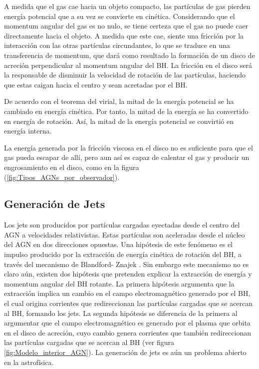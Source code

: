 A medida que el gas cae hacia un objeto compacto, las partículas de gas pierden energía potencial que a su vez se convierte en cinética. Considerando que el momentum angular del gas es no nulo, se tiene certeza que el gas no puede caer directamente hacia el objeto. A medida que este cae, siente una fricción por la interacción con las otras partículas circundantes, lo que se traduce en una transferencia de momentum, que dará como resultado la formación de un disco de acreción perpendicular al momentum angular del BH. La fricción en el disco será la responsable de disminuir la velocidad de rotación de las partículas, haciendo que estas caigan hacia el centro y sean acretadas por el BH.  

De acuerdo con el teorema del virial, la mitad de la energía potencial se ha cambiado en energía cinética. Por tanto, la mitad de la energía se ha convertido en energía de rotación. Así, la mitad de la energía potencial se convirtió en energía interna. 

La energía generada por la fricción viscosa en el disco no es suficiente para que el gas pueda escapar de allí, pero aun así es capaz de calentar el gas y producir un engrosamiento en el disco, como en la figura (\ref{fig:Tipos_AGNs_por_observador}).


	\subsection{Generación de Jets}
	\label{subsec:Generation_Jets}

Los jets son producidos por partículas cargadas eyectadas desde el centro del AGN a velocidades relativistas. Estas partículas son aceleradas desde el núcleo del AGN en dos direcciones opuestas. Una hipótesis de este fenómeno es el impulso producido por la extracción de energía cinética de rotación del BH, a través del mecanismo de Blandford- Znajek \cite{blandford1977}.  
Sin embargo este mecanismo no es claro aún, existen dos hipótesis que pretenden explicar la extracción de  energía y momentum angular del BH rotante. La primera hipótesis argumenta que la extracción  implica un cambio en el campo electromagnético generado por el BH, el cual origina corrientes que redireccionan las partículas cargadas que se acercan al BH, formando los jets. La segunda hipótesis se diferencia de la primera al argumentar que el campo electromagnético es generado por el plasma que orbita en el disco de acreción, cuyo cambio genera corrientes que también redireccionan las partículas cargadas que se acercan al BH 
(ver figura  \ref{fig:Modelo_interior_AGN}).
La generación de jets es aún un problema abierto en la astrofísica.%

